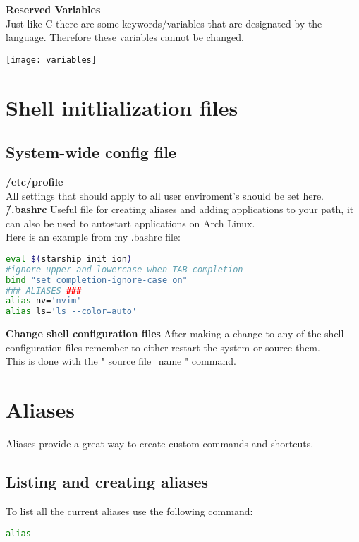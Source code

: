 \documentclass[12pt, letterpaper]{report}
\begin{document}
\textbf{Reserved Variables}\\
Just like C there are some keywords/variables that are designated by the language.
Therefore these variables cannot be changed.
\begin{center}
\texttt{[image: variables]}
\end{center}

\section{Shell initlialization files}
\subsection{System-wide config file}

\textbf{/etc/profile}\\
All settings that should apply to all user enviroment's should be set here. \\

\textbf{\~/.bashrc}
Useful file for creating aliases and adding applications to your path, it can 
also be used to autostart applications on Arch Linux.\\
Here is an example from my .bashrc file:
\begin{lstlisting}[language=Bash,framexleftmargin=5mm,frame=single,xleftmargin=18pt]
eval $(starship init ion)
#ignore upper and lowercase when TAB completion
bind "set completion-ignore-case on"
### ALIASES ###
alias nv='nvim'
alias ls='ls --color=auto'
\end{lstlisting}

\textbf{Change shell configuration files}
After making a change to any of the shell configuration files remember to either 
restart the system or source them.\\
This is done with the " source file\_name " command.

\section{Aliases}
Aliases provide a great way to create custom commands and shortcuts.

\subsection{Listing and creating aliases}
To list all the current aliases use the following command:
\begin{lstlisting}[language=Bash,framexleftmargin=5mm,frame=single,xleftmargin=18pt]
alias
\end{lstlisting}
\end{document}
